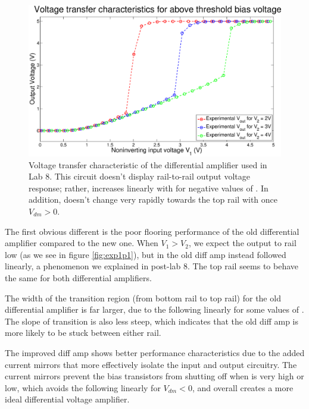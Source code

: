 \begin{figure}[H]
\centering
\includegraphics[width=\linewidth]{../Figures/OldVTC.eps}
\caption{Voltage transfer characteristic of the differential amplifier used in Lab 8. This circuit doesn't display rail-to-rail output voltage response; rather, \Vout increases linearly with \Vin for negative values of \Vdm. In addition, \Vout doesn't change very rapidly towards the top rail with once $V_{dm} > 0$.}
\label{fig:oldvtc}
\end{figure}

The first obvious different is the poor flooring performance of the old differential amplifier compared to the new one. When $V_1 > V_2$, we expect the output to rail low (as we see in figure \ref{fig:exp1p1}), but in the old diff amp \Vout instead followed \Vone linearly, a phenomenon we explained in post-lab 8. The top rail seems to behave the same for both differential amplifiers.

The width of the transition region (from bottom rail to top rail) for the old differential amplifier is far larger, due to the \Vout following \Vone linearly for some values of \Vone. The slope of transition is also less steep, which indicates that the old diff amp is more likely to be stuck between either rail.

The improved diff amp shows better performance characteristics due to the added current mirrors that more effectively isolate the input and output circuitry. The current mirrors prevent the bias transistors from shutting off when \Vout is very high or low, which avoids the \Vout following \Vin linearly for $V_{dm} < 0$, and overall creates a more ideal differential voltage amplifier.